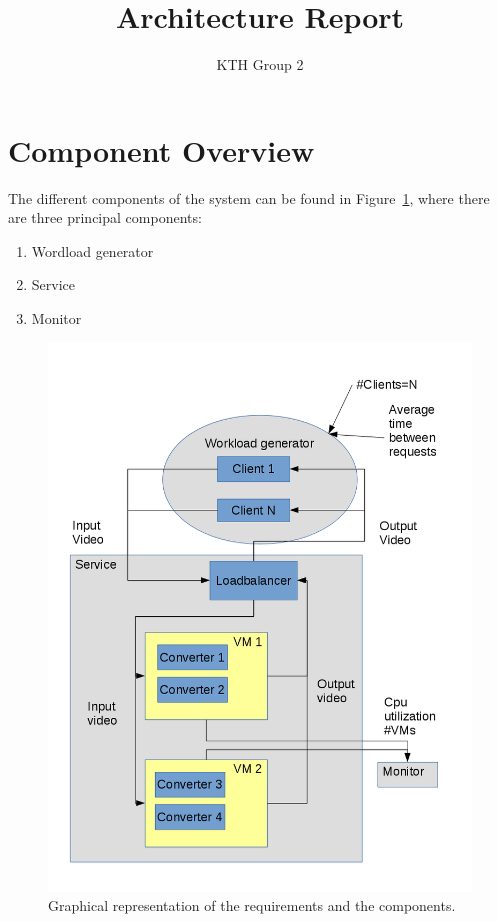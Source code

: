 \documentclass[]{article}
\title{Architecture Report}
\author{KTH Group 2} %
\begin{document}
\maketitle

\section*{Component Overview}
The different components of the system can be found in
Figure~\ref{fig:system_diagram}, where there are three principal
components:
\begin{enumerate}
\item Wordload generator
\item Service
\item Monitor
\end{enumerate}

\begin{figure}[!t]
  \centering
  \includegraphics[width=\linewidth]{system_diagram}
  \caption{Graphical representation of the requirements and the
    components.}
  \label{fig:system_diagram}
\end{figure}
\end{document}

